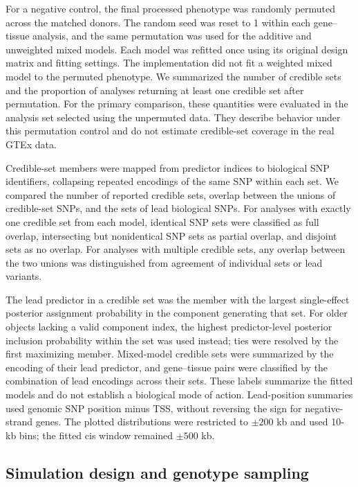 \documentclass[12pt]{article}
\begin{document}
For a negative control, the final processed phenotype was randomly
permuted across the matched donors. The random seed was reset to 1
within each gene--tissue analysis, and the same permutation was used
for the additive and unweighted mixed models. Each model was refitted
once using its original design matrix and fitting settings. The
implementation did not fit a weighted mixed model to the permuted
phenotype. We summarized the number of credible sets and the proportion
of analyses returning at least one credible set after permutation.
For the primary comparison, these quantities were evaluated in the
analysis set selected using the unpermuted data. They describe behavior
under this permutation control and do not estimate credible-set
coverage in the real GTEx data.

Credible-set members were mapped from predictor indices to biological
SNP identifiers, collapsing repeated encodings of the same SNP within
each set. We compared the number of reported credible sets, overlap
between the unions of credible-set SNPs, and the sets of lead biological
SNPs. For analyses with exactly one credible set from each model,
identical SNP sets were classified as full overlap, intersecting but
nonidentical SNP sets as partial overlap, and disjoint sets as no overlap.
For analyses with multiple credible sets, any overlap between the two
unions was distinguished from agreement of individual sets or lead
variants.

The lead predictor in a credible set was the member with the largest
single-effect posterior assignment probability in the component
generating that set. For older objects lacking a valid component index,
the highest predictor-level posterior inclusion probability within the
set was used instead; ties were resolved by the first maximizing member.
Mixed-model credible sets were summarized by the encoding of their
lead predictor, and gene--tissue pairs were classified by the combination
of lead encodings across their sets. These labels summarize the fitted
models and do not establish a biological mode of action. Lead-position
summaries used genomic SNP position minus TSS, without reversing the
sign for negative-strand genes. The plotted distributions were restricted
to $\pm 200$ kb and used 10-kb bins; the fitted cis window remained
$\pm 500$ kb.

\subsection{Simulation design and genotype sampling}
\end{document}
